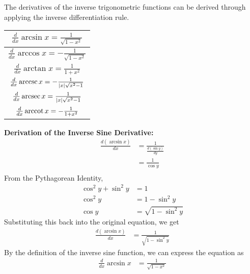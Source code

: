         \noindent The derivatives of the inverse trigonometric functions can be derived through
        applying the inverse differentiation rule. \\

        \begin{center}
            \begin{tabular}{|c|}
                \hline
                $\frac{d}{dx}\arcsin{x} = \frac{1}{\sqrt{1-x^2}}$ \\
                \hline
                $\frac{d}{dx}\arccos{x} = -\frac{1}{\sqrt{1-x^2}}$ \\
                \hline
                $\frac{d}{dx}\arctan{x} = \frac{1}{1+x^2}$ \\
                \hline
                $\frac{d}{dx}\operatorname{arccsc}{x} = -\frac{1}{|x|\sqrt{x^2-1}}$ \\
                \hline
                $\frac{d}{dx}\operatorname{arcsec}{x} = \frac{1}{|x|\sqrt{x^2-1}}$ \\
                \hline
                $\frac{d}{dx}\operatorname{arccot}{x} = -\frac{1}{1+x^2}$ \\
                \hline
            \end{tabular}
        \end{center}


        \noindent \color{purple} \textbf{Derivation of the Inverse Sine Derivative:} \color{black} \\
        \begin{align*}
            \frac{d(\arcsin{x})}{dx} &= \frac{1}{\frac{d(\sin{y})}{dy}} \\
            &= \frac{1}{\cos{y}} \\
        \end{align*}
        \noindent From the Pythagorean Identity, \\
        \begin{align*}
            \cos^2{y} + \sin^2{y} &= 1 \\
            \cos^2{y} &= 1 - \sin^2{y} \\
            \cos{y} &= \sqrt{1-\sin^2{y}}
        \end{align*}
        \noindent Substituting this back into the original equation, we get \\
        \begin{align*}
            \frac{d(\arcsin{x})}{dx} &= \frac{1}{\sqrt{1-\sin^2{y}}}
        \end{align*}
        \noindent By the definition of the inverse sine function, we can express the equation as \\
        \begin{align*}
            \frac{d}{dx}\arcsin{x} &= \frac{1}{\sqrt{1-x^2}}
        \end{align*}

